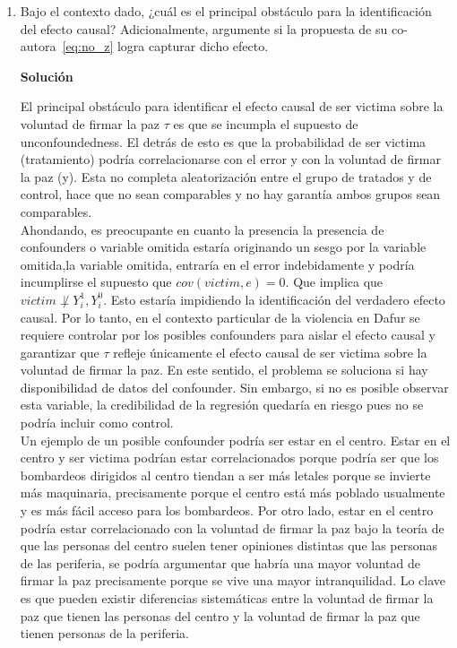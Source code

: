 \documentclass[a4paper, answers, addpoints, 11pt]{exam}
\newenvironment{solucion}{%
  \begin{mdframed}[
    backgroundcolor=blue!5,    %
    linecolor=blue!50,          %
    linewidth=2pt,              %
    leftmargin=10pt,            %
    rightmargin=8pt,           %
    topline=true,              %
    bottomline=true,            %
    roundcorner=10pt,           %
    innerleftmargin=10pt,       %
    innerrightmargin=10pt,      %
    innerbottommargin=10pt,     %
    innertopmargin=10pt         %
  ]%
  \begin{tcolorbox}[colframe=blue!50!black, colback=blue!50, coltitle=white, sharp corners=all, boxrule=1mm, width=\textwidth, halign=left, valign=center, top=0mm, bottom=0mm, left=0mm, right=0mm] \textbf{Solución} \end{tcolorbox} }{\end{mdframed}}
\begin{document}
\begin{enumerate}
    \item Bajo el contexto dado, ¿cuál es el principal obstáculo para la identificación del efecto causal? Adicionalmente, argumente si la propuesta de su co-autora~\eqref{eq:no_z} logra capturar dicho efecto.
    \begin{solucion}
        
        El principal obstáculo para identificar el efecto causal de ser victima sobre la voluntad de firmar la paz $\tau$ es que se incumpla el supuesto de unconfoundedness. El detrás de esto es que la probabilidad de ser victima (tratamiento) podría correlacionarse con el error y con la voluntad de firmar la paz (y). Esta no completa aleatorización entre el grupo de tratados y de control, hace que no sean comparables y no hay garantía ambos grupos sean comparables.\\
        
        Ahondando, es preocupante en cuanto la presencia la presencia de confounders o variable omitida estaría originando un sesgo por la variable omitida,la variable omitida, entraría en el error indebidamente y podría incumplirse el supuesto que $cov(victim, e)=0$. Que implica que $victim \not \perp Y_i^1, Y_i^0.$ Esto estaría impidiendo la identificación del verdadero efecto causal. Por lo tanto, en el contexto particular de la violencia en Dafur se requiere controlar por los posibles confounders para aislar el efecto causal y garantizar que $\tau$ refleje únicamente el efecto causal de ser victima sobre la voluntad de firmar la paz.  En este sentido, el problema se soluciona si hay disponibilidad de datos del confounder. Sin embargo, si no es posible observar esta variable, la credibilidad de la regresión quedaría en riesgo pues no se podría incluir como control.\\

        Un ejemplo de un posible confounder podría ser estar en el centro. Estar en el centro y ser victima podrían estar correlacionados porque podría ser que los bombardeos dirigidos al centro tiendan a ser más letales porque se invierte más maquinaria, precisamente porque el centro está más poblado usualmente y es más fácil acceso para los bombardeos. Por otro lado, estar en el centro podría estar correlacionado con la voluntad de firmar la paz bajo la teoría de que las personas del centro suelen tener opiniones distintas que las personas de las periferia, se podría argumentar que habría una mayor voluntad de firmar la paz precisamente porque se vive una mayor intranquilidad. Lo clave es que pueden existir diferencias sistemáticas entre la voluntad de firmar la paz que tienen las personas del centro y la voluntad de firmar la paz que tienen personas de la periferia.\\


\end{solucion}
\end{enumerate}
\end{document}
